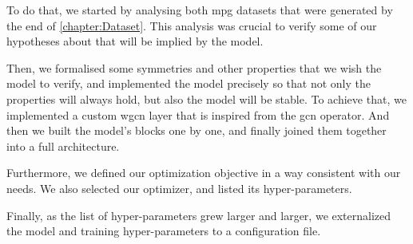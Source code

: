 To do that, we started by analysing both \acrshort{mpg} datasets that were generated by the end of \ref{chapter:Dataset}. This analysis was crucial to verify some of our hypotheses about  that will be implied by the model.

Then, we formalised some symmetries and other properties that we wish the model to verify, and implemented the model precisely so that not only the properties will always hold, but also the model will be stable. To achieve that, we implemented a custom \acrshort{wgcn} layer that is inspired from the \acrshort{gcn} operator. And then we built the model's blocks one by one, and finally joined them together into a full architecture.

Furthermore, we defined our optimization objective in a way consistent with our needs. We also selected our optimizer, and listed its hyper-parameters.

Finally, as the list of hyper-parameters grew larger and larger, we externalized the model and training hyper-parameters to a configuration file.
